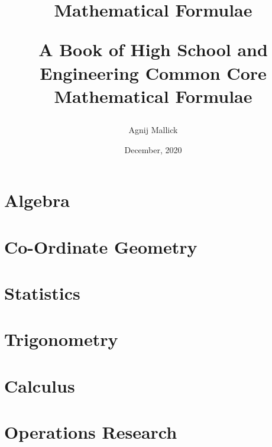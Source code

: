 \documentclass[openany, oneside]{book}
\title{Mathematical Formulae\\\begin{large}
A Book of High School and Engineering Common Core Mathematical Formulae
\end{large}}
\date{December, 2020}
\author{Agnij Mallick}
\begin{document}
\frontmatter
\maketitle

\tableofcontents
\newpage

\mainmatter

\part{Algebra}










\part{Co-Ordinate Geometry}











\part{Statistics}







\part{Trigonometry}




\part{Calculus}














\part{Operations Research}

\end{document}
